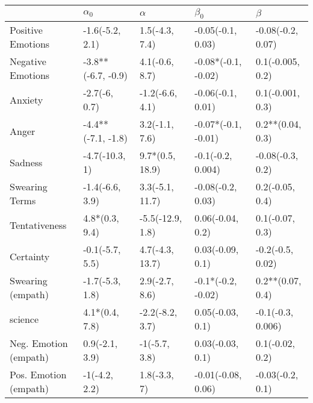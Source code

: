 \begin{tabular}{lllll}
\toprule
{} &          $\alpha_0$ &          $\alpha$ &            $\beta_0$ &            $\beta$ \\
\midrule
Positive Emotions     &     -1.6(-5.2, 2.1) &    1.5(-4.3, 7.4) &    -0.05(-0.1, 0.03) &  -0.08(-0.2, 0.07) \\
Negative Emotions     &  -3.8**(-6.7, -0.9) &    4.1(-0.6, 8.7) &  -0.08*(-0.1, -0.02) &   0.1(-0.005, 0.2) \\
Anxiety               &       -2.7(-6, 0.7) &   -1.2(-6.6, 4.1) &    -0.06(-0.1, 0.01) &   0.1(-0.001, 0.3) \\
Anger                 &  -4.4**(-7.1, -1.8) &    3.2(-1.1, 7.6) &  -0.07*(-0.1, -0.01) &   0.2**(0.04, 0.3) \\
Sadness               &      -4.7(-10.3, 1) &   9.7*(0.5, 18.9) &    -0.1(-0.2, 0.004) &   -0.08(-0.3, 0.2) \\
Swearing Terms        &     -1.4(-6.6, 3.9) &   3.3(-5.1, 11.7) &    -0.08(-0.2, 0.03) &    0.2(-0.05, 0.4) \\
Tentativeness         &      4.8*(0.3, 9.4) &  -5.5(-12.9, 1.8) &     0.06(-0.04, 0.2) &    0.1(-0.07, 0.3) \\
Certainty             &     -0.1(-5.7, 5.5) &   4.7(-4.3, 13.7) &     0.03(-0.09, 0.1) &   -0.2(-0.5, 0.02) \\
Swearing (empath)     &     -1.7(-5.3, 1.8) &    2.9(-2.7, 8.6) &   -0.1*(-0.2, -0.02) &   0.2**(0.07, 0.4) \\
science               &      4.1*(0.4, 7.8) &   -2.2(-8.2, 3.7) &     0.05(-0.03, 0.1) &  -0.1(-0.3, 0.006) \\
Neg. Emotion (empath) &      0.9(-2.1, 3.9) &     -1(-5.7, 3.8) &     0.03(-0.03, 0.1) &    0.1(-0.02, 0.2) \\
Pos. Emotion (empath) &       -1(-4.2, 2.2) &      1.8(-3.3, 7) &   -0.01(-0.08, 0.06) &   -0.03(-0.2, 0.1) \\
\bottomrule
\end{tabular}
